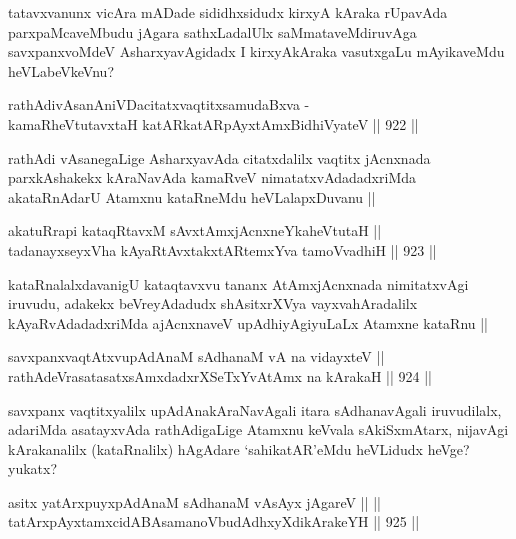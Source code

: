 \begin{artha}
tatavxvanunx vicAra mADade sididhxsidudx kirxyA kAraka rUpavAda parxpaMcaveMbudu jAgara sathxLadalUlx saMmataveMdiruvAga savxpanxvoMdeV AsharxyavAgidadx I kirxyAkAraka vasutxgaLu mAyikaveMdu heVLabeVkeVnu?
\end{artha}

\begin{shl}
rathAdivAsanAniVDacitatxvaqtitxsamudaBxva -\\
kamaRheVtutavxtaH katAR\s katAR\s pAyxtAmx\s BidhiVyateV ||  922 ||  
\end{shl}

\begin{artha}
rathAdi vAsanegaLige AsharxyavAda citatxdalilx vaqtitx jAcnxnada parxkAshakekx kAraNavAda kamaRveV nimatatxvAdadadxriMda akataRnAdarU Atamxnu kataRneMdu heVLalapxDuvanu ||
\end{artha}

\begin{shl}
akatuRrapi kataqRtavxM sAvxtAmxjAcnxneYkaheVtutaH || \\
tadanayxseyxVha kAyaRtAvxtakxtAR\s \s temxYva tamoVvadhiH ||  923 ||  
\end{shl}

\begin{artha}
kataRnalalxdavanigU kataqtavxvu tananx AtAmxjAcnxnada nimitatxvAgi iruvudu, adakekx beVreyAdadudx shAsitxrXVya vayxvahAradalilx kAyaRvAdadadxriMda ajAcnxnaveV upAdhiyAgiyuLaLx Atamxne kataRnu ||
\end{artha}

\begin{shl}
savxpanxvaqtAtxvupAdAnaM sAdhanaM vA na vidayxteV || \\
rathAdeVrasatasatxsAmxdadxrXSeTxYvA\s \s tAmx na kArakaH ||  924 ||  
\end{shl}

\begin{artha}
savxpanx vaqtitxyalilx upAdAnakAraNavAgali itara sAdhanavAgali iruvudilalx, adariMda asatayxvAda rathAdigaLige Atamxnu keVvala sAkiSxmAtarx, nijavAgi kArakanalilx (kataRnalilx) hAgAdare `sahikatAR'eMdu heVLidudx heVge? yukatx?
\end{artha}

\begin{shl}
asitx yatArxpuyxpAdAnaM sAdhanaM vA\s sAyx jAgareV ||  || \\
tatArxpAyxtamxcidABAsamanoVbudAdhxyXdikArakeYH ||  925 ||  
\end{shl}
				
